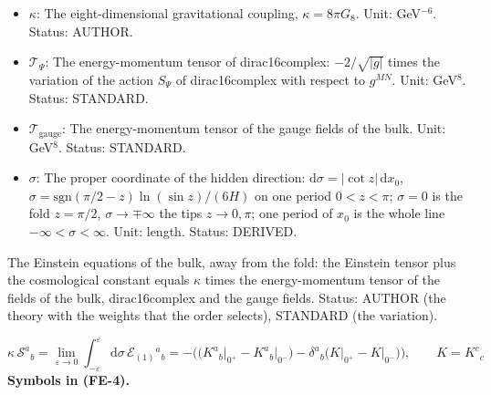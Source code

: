 \documentclass[
  10pt,
]{article}
\begin{document}
\begin{itemize}
  lower ones, 0 otherwise). Status: STANDARD.
\item
  \(\kappa\): The eight-dimensional gravitational coupling,
  \(\kappa = 8\pi G_8\). Unit: GeV\(^{-6}\). Status: AUTHOR.
\item
  \(\mathcal{T}_\Psi\): The energy-momentum tensor of dirac16complex:
  \(-2/\sqrt{\lvert g\rvert}\) times the variation of the action
  \(S_\Psi\) of dirac16complex with respect to \(g^{MN}\). Unit:
  GeV\(^8\). Status: STANDARD.
\item
  \(\mathcal{T}_{\mathrm{gauge}}\): The energy-momentum tensor of the
  gauge fields of the bulk. Unit: GeV\(^8\). Status: STANDARD.
\item
  \(\sigma\): The proper coordinate of the hidden direction:
  \(\mathrm{d}\sigma = \lvert\cot z\rvert\,\mathrm{d}x_0\),
  \(\sigma = \mathrm{sgn}(\pi/2 - z)\ln(\sin z)/(6H)\) on one period
  \(0 < z < \pi\); \(\sigma = 0\) is the fold \(z = \pi/2\),
  \(\sigma \to \mp\infty\) the tips \(z \to 0, \pi\); one period of
  \(x_0\) is the whole line \(-\infty < \sigma < \infty\). Unit: length.
  Status: DERIVED.
\end{itemize}

The Einstein equations of the bulk, away from the fold: the Einstein
tensor plus the cosmological constant equals \(\kappa\) times the
energy-momentum tensor of the fields of the bulk, dirac16complex and the
gauge fields. Status: AUTHOR (the theory with the weights that the order
selects), STANDARD (the variation).

\[
\kappa\,\mathcal{S}^a{}_b = \lim_{\varepsilon\to0}\int_{-\varepsilon}^{\varepsilon}\mathrm{d}\sigma\,\mathcal{E}_{(1)}{}^a{}_b
 = -\Big(\big(K^a{}_b\big\vert_{0^+} - K^a{}_b\big\vert_{0^-}\big) - \delta^a{}_b\big(K\big\vert_{0^+} - K\big\vert_{0^-}\big)\Big),\qquad
 K = K^c{}_c \tag{FE-4}
\] \textbf{Symbols in (FE-4).}
\end{document}
